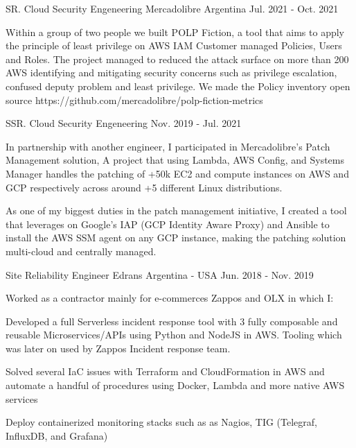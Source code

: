 \begin{cventries}
	\cventry
	{SR. Cloud Security Engeneering} %
	{Mercadolibre} %
	{Argentina} %
	{Jul. 2021 - Oct. 2021} %
	{
		\begin{cvitems} %
			\item {Within a group of two people we built POLP Fiction, a tool that aims to apply the principle of least privilege on AWS IAM Customer managed Policies, Users and Roles. The project managed to reduced the attack surface on more than 200 AWS identifying and mitigating security concerns such as privilege escalation, confused deputy problem and least privilege. We made the Policy inventory open source https://github.com/mercadolibre/polp-fiction-metrics}
		\end{cvitems}
	}
	\cventry
	{SSR. Cloud Security Engeneering} %
	{} %
	{} %
	{Nov. 2019 - Jul. 2021} %
	{
		\begin{cvitems} %
			\item {In partnership with another engineer, I participated in Mercadolibre's Patch Management solution, A project that using Lambda, AWS Config, and Systems Manager handles the patching of +50k EC2 and compute instances on AWS and GCP respectively across around +5 different Linux distributions.}
			\item {As one of my biggest duties in the patch management initiative, I created a tool that leverages on Google's IAP (GCP Identity Aware Proxy) and Ansible to install the AWS SSM agent on any GCP instance, making the patching solution multi-cloud and centrally managed.}
		\end{cvitems}
	}

	\cventry
	{Site Reliability Engineer} %
	{Edrans} %
	{Argentina - USA} %
	{Jun. 2018 - Nov. 2019} %
	{
		{Worked as a contractor mainly for e-commerces Zappos and OLX in which I:}
		\linebreak
		\begin{cvitems} %
			\item {Developed a full Serverless incident response tool with 3 fully composable and reusable Microservices/APIs using Python and NodeJS in AWS. Tooling which was later on used by Zappos Incident response team.}
			\item {Solved several IaC issues with Terraform and CloudFormation in AWS and automate a handful of procedures using Docker, Lambda and more native AWS services}
			\item {Deploy containerized monitoring stacks such as as Nagios, TIG (Telegraf, InfluxDB, and Grafana)}
		\end{cvitems}
	}


\end{cventries}
